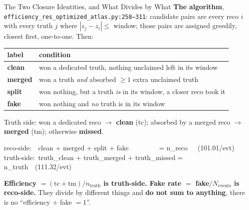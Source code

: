 \documentclass[xcolor=table,aspectratio=169]{beamer}
\begin{document}
\begin{frame}[shrink=15]{The Two Closure Identities, and What Divides by What}
    \small
    \textbf{The algorithm}, \texttt{efficiency\_res\_optimized\_atlas.py:258--311}:
    candidate pairs are every reco $i$ with every truth $j$ where
    $|z_j - z_i| \leq$ window; those pairs are assigned greedily, closest first,
    one-to-one. Then:

    \vspace{0.3em}
    \begin{center}\footnotesize
    \begin{tabular}{ll}
        \hline
        \textbf{label} & \textbf{condition} \\
        \hline
        \textcolor{mygreen!70!black}{\textbf{clean}}  & won a dedicated truth, nothing unclaimed left in its window \\
        \textcolor{myorange!85!black}{\textbf{merged}} & won a truth \emph{and} absorbed $\geq 1$ extra unclaimed truth \\
        \textcolor{myblue}{\textbf{split}}   & won nothing, but a truth \emph{is} in its window, a closer reco took it \\
        \textcolor{myred}{\textbf{fake}}    & won nothing and \emph{no} truth is in its window \\
        \hline
    \end{tabular}
    \end{center}
    \vspace{0.2em}

    Truth side: won a dedicated reco $\to$ \textbf{clean} (tc); absorbed by a merged
    reco $\to$ \textbf{merged} (tm); otherwise \textbf{missed}.

    \vspace{0.4em}
    \begin{center}
    \colorbox{black!5}{\parbox{0.93\linewidth}{\footnotesize\ttfamily
    reco-side:\ \ clean + merged + split + fake\ \ \ \ \ \ \ \ \ = n\_reco\ \ \ (101.01/evt)\\
    truth-side:\ truth\_clean + truth\_merged + truth\_missed = n\_truth\ \ (111.32/evt)}}
    \end{center}
    \vspace{0.3em}

    \textcolor{pennred}{\textbf{Efficiency $=(\text{tc}+\text{tm})/n_\text{truth}$ is
    truth-side. Fake rate $=$ fake$/N_\text{events}$ is reco-side.}} They divide by
    different things and \textbf{do not sum to anything}, there is no
    ``efficiency $+$ fake $= 1$''.
\end{frame}
\end{document}
